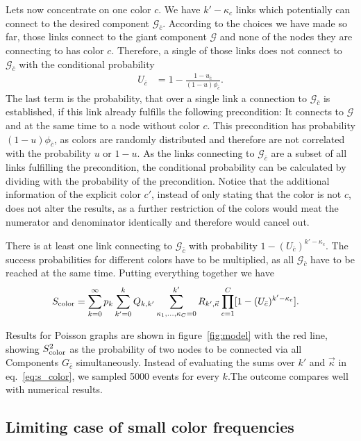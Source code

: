 \documentclass[aps, pre, onecolumn, a4paper, floatfix]{revtex4}
\begin{document}
Lets now concentrate on one color $c$. We have 
$k'-\kappa_c$ links which potentially can connect to the desired component ${\mathcal G}_{\bar c}$. 
According to the choices we have made so far, those links connect to the giant component 
${\mathcal G}$ and none of the nodes they are connecting to has color $c$. Therefore, a single 
of those links does not connect 
to ${\mathcal G}_{\bar c}$ with the conditional probability 
%
\begin{align}
U_{\bar c} &= 1 - \frac{1-u_{\bar c}}{(1-u)\phi_{\bar c}}.\label{eq:U_c}
\end{align}
The last term is the probability, that over a single link a connection to ${\mathcal G}_{\bar c}$
is established, if this link already fulfills the following precondition: 
It connects to ${\mathcal G}$ and at the same time to a node without color $c$. 
This precondition has probability $(1-u)\phi_{\bar c}$, as colors are randomly distributed and therefore 
are not correlated with the probability $u$ or $1-u$. As the links connecting to ${\mathcal G}_{\bar c}$ 
are a subset of all links fulfilling the precondition, the conditional probability can be 
calculated by dividing with the probability of the precondition. 
Notice that the additional information of the explicit color $c'$, instead of only stating that the color 
is not $c$, does not alter the results, as a further restriction of the colors 
would meat the numerator and denominator identically and therefore would cancel out. 

There is at least one link connecting to ${\mathcal G}_{\bar c}$ with probability 
$1-(U_{\bar c})^{k'-\kappa_c}$. The success probabilities for different colors have to be 
multiplied, as all ${\mathcal G}_{\bar c}$ have to be reached at the same time. 
Putting everything together we have 
%
\begin{align}
S_{\rm color} &= \sum_{k=0}^{\infty}p_k \sum_{k'=0}^{k} Q_{k,k'} 
\sum_{\kappa_1,\dots, \kappa_C=0}^{k'} R_{k',\vec \kappa} 
\prod_{c=1}^C [1-(U_{\bar c})^{k'-\kappa_c}].\label{eq:s_color}
\end{align}

Results for Poisson graphs are shown in figure~\ref{fig:model} with the red line, showing 
$S_{\rm color}^2$ as the probability of two nodes to be connected via all Components 
$G_{\bar c}$ simultaneously. Instead of evaluating the sums over $k'$ and $\vec \kappa$ 
in eq.~\ref{eq:s_color}, we sampled 5000 events for every $k$.The outcome compares well with 
numerical results. 

\subsection{Limiting case of small color frequencies}
\end{document}
